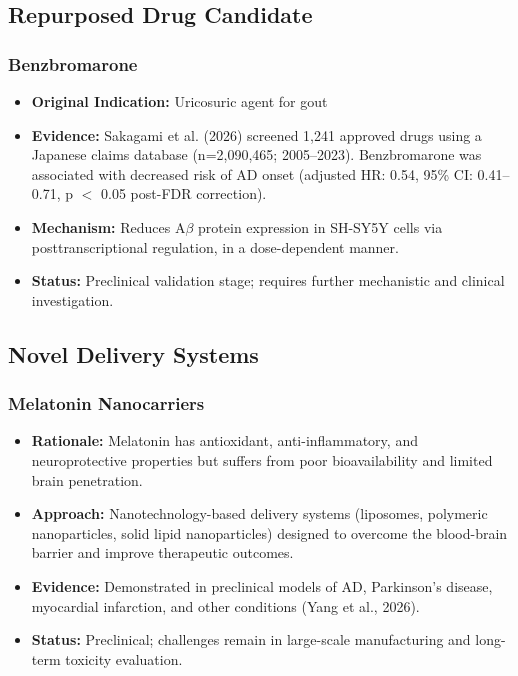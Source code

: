 \documentclass[11pt, a4paper]{article}
\begin{document}
\subsection{Repurposed Drug Candidate}

\subsubsection{Benzbromarone}
\begin{itemize}
    \item \textbf{Original Indication:} Uricosuric agent for gout
    \item \textbf{Evidence:} Sakagami et al. (2026) screened 1,241 approved drugs using a Japanese claims database (n=2,090,465; 2005--2023). Benzbromarone was associated with decreased risk of AD onset (adjusted HR: 0.54, 95\% CI: 0.41--0.71, p $<$ 0.05 post-FDR correction).
    \item \textbf{Mechanism:} Reduces A$\beta$ protein expression in SH-SY5Y cells via posttranscriptional regulation, in a dose-dependent manner.
    \item \textbf{Status:} Preclinical validation stage; requires further mechanistic and clinical investigation.
\end{itemize}

\subsection{Novel Delivery Systems}

\subsubsection{Melatonin Nanocarriers}
\begin{itemize}
    \item \textbf{Rationale:} Melatonin has antioxidant, anti-inflammatory, and neuroprotective properties but suffers from poor bioavailability and limited brain penetration.
    \item \textbf{Approach:} Nanotechnology-based delivery systems (liposomes, polymeric nanoparticles, solid lipid nanoparticles) designed to overcome the blood-brain barrier and improve therapeutic outcomes.
    \item \textbf{Evidence:} Demonstrated in preclinical models of AD, Parkinson's disease, myocardial infarction, and other conditions (Yang et al., 2026).
    \item \textbf{Status:} Preclinical; challenges remain in large-scale manufacturing and long-term toxicity evaluation.
\end{itemize}
\end{document}
